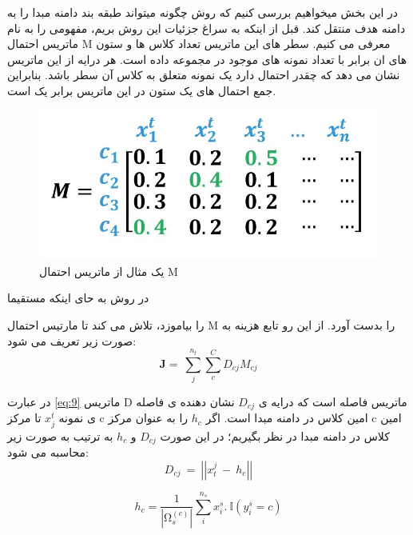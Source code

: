 {{		\subsubsection{}
		{
			در این بخش میخواهیم بررسی کنیم که روش 
			چگونه میتواند طبقه بند دامنه مبدا را به دامنه هدف منتقل کند. قبل از اینکه به سراغ جزئیات این روش بریم، مفهومی را به نام ماتریس احتمال M معرفی می کنیم. سطر های این ماتریس تعداد کلاس ها و ستون های ان برابر با تعداد نمونه های موجود در مجموعه داده است. هر درایه از این ماتریس نشان می دهد که چقدر احتمال دارد یک نمونه متعلق به کلاس آن سطر باشد. بنابراین جمع احتمال های یک ستون در این ماتریس برابر یک است.
			\begin{figure}[h]
				\centering
				\includegraphics[scale=0.3]{images/annotation.JPG}
				\caption{یک مثال از ماتریس احتمال M}
				\label{fig:7}
			\end{figure}
			
			در روش 
			به حای اینکه مستقیما 
			
			را بیاموزد، تلاش می کند تا مارتیس احتمال M را بدست آورد. از این رو تابع هزینه به صورت زیر تعریف می شود:
			\begin{equation}
			\mathbf{J}=\ \sum_{j}^{n_t}\sum_{c}^{C}{D_{cj}}M_{cj}
			\label{eq:9}
			\end{equation}
			
			در عبارت 
			\ref{eq:9}
			ماتریس D ماتریس فاصله است که درایه ی 
			$D_{cj}$
			نشان دهنده ی فاصله ی نمونه
			$x_j^t$
			تا مرکز c امین کلاس در دامنه مبدا است. اگر 
			$h_c$
			را به عنوان مرکز c امین کلاس در دامنه مبدا در نظر بگیریم؛ در این صورت 
			$D_{cj}$
			و 
			$h_c$
			به ترتیب به صورت زیر محاسبه می شود:
			\begin{equation}
			D_{cj}\ =\ \left|\left|x_t^j\ -\ h_c\right|\right|
			\label{eq:10}
			\end{equation}
			
			\begin{equation}
			h_c=\frac{1}{\left|\mathrm{\Omega}_s^{\left(c\right)}\right|}\sum_{i}^{n_s}{x_i^s.\ \mathbb{I}\left(y_i^s=c\right)}
			\label{eq:11}
			\end{equation}
			
}}}
